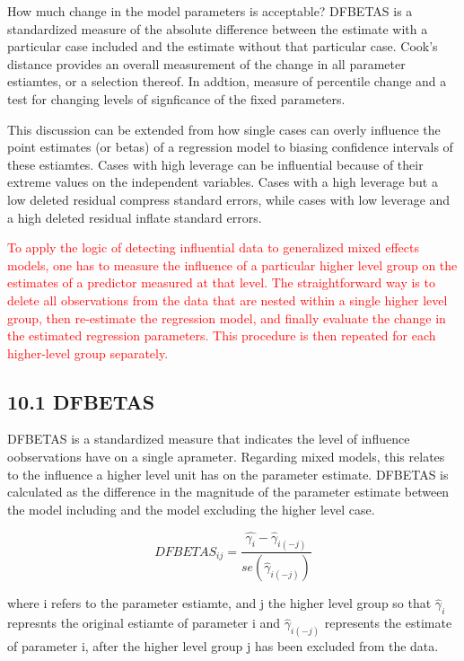 \documentclass[12pt,]{article}
\begin{document}
{How much change in the model parameters is acceptable? DFBETAS is a
standardized measure of the absolute difference between the estimate
with a particular case included and the estimate without that particular
case. Cook's distance provides an overall measurement of the change in
all parameter estiamtes, or a selection thereof. In addtion, measure of
percentile change and a test for changing levels of signficance of the
fixed parameters.

This discussion can be extended from how single cases can overly
influence the point estimates (or betas) of a regression model to
biasing confidence intervals of these estiamtes. Cases with high
leverage can be influential because of their extreme values on the
independent variables. Cases with a high leverage but a low deleted
residual compress standard errors, while cases with low leverage and a
high deleted residual inflate standard errors.

\textcolor{red}{To apply the logic of detecting influential data to generalized mixed effects models, one has to measure the influence of a particular higher level group
on the estimates of a predictor measured at that level.
The straightforward way is to delete all observations
from the data that are nested within a single higher
level group, then re-estimate the regression model,
and finally evaluate the change in the estimated regression parameters. This procedure is then repeated
for each higher-level group separately.}

\subsection{10.1 DFBETAS}\label{dfbetas}

DFBETAS is a standardized measure that indicates the level of influence
oobservations have on a single aprameter. Regarding mixed models, this
relates to the influence a higher level unit has on the parameter
estimate. DFBETAS is calculated as the difference in the magnitude of
the parameter estimate between the model including and the model
excluding the higher level case.

\[DFBETAS_{ij} = \frac{\hat{\gamma_i} - \hat{\gamma}_{i(-j)}}{se(\hat{\gamma}_{i(-j)})}\]

where i refers to the parameter estiamte, and j the higher level group
so that \(\hat{\gamma}_i\) represnts the original estiamte of parameter
i and \(\hat{\gamma}_{i(-j)}\) represents the estimate of parameter i,
after the higher level group j has been excluded from the data.

}
\end{document}
